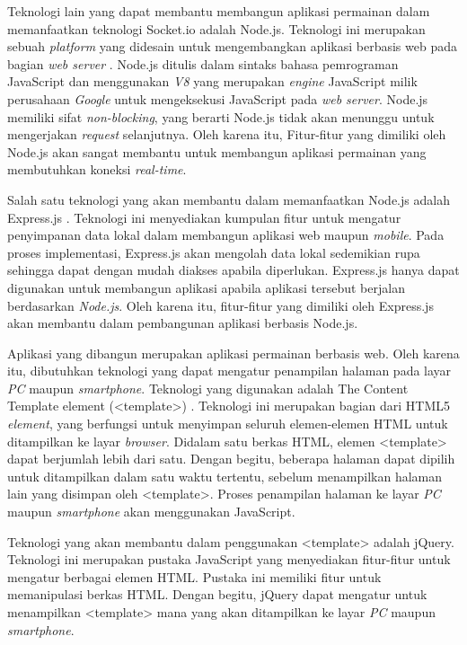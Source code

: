 Teknologi lain yang dapat membantu membangun aplikasi permainan dalam memanfaatkan teknologi Socket.io adalah Node.js. Teknologi ini merupakan sebuah \textit{platform} yang didesain untuk mengembangkan aplikasi berbasis web pada bagian \textit{web server} \cite{dahl:09:nodejsdocs}. Node.js ditulis dalam sintaks bahasa pemrograman JavaScript dan menggunakan \textit{V8} yang merupakan \textit{engine} JavaScript milik perusahaan \textit{Google} untuk mengeksekusi JavaScript pada \textit{web server}. Node.js memiliki sifat \textit{non-blocking}, yang berarti Node.js tidak akan menunggu untuk mengerjakan \textit{request} selanjutnya. Oleh karena itu, Fitur-fitur yang dimiliki oleh Node.js akan sangat membantu untuk membangun aplikasi permainan yang membutuhkan koneksi \textit{real-time}.

Salah satu teknologi yang akan membantu dalam memanfaatkan Node.js adalah Express.js \cite{tj:10:expressjs}. Teknologi ini menyediakan kumpulan fitur untuk mengatur penyimpanan data lokal dalam membangun aplikasi web maupun \textit{mobile}. Pada proses implementasi, Express.js akan mengolah data lokal sedemikian rupa sehingga dapat dengan mudah diakses apabila diperlukan. Express.js hanya dapat digunakan untuk membangun aplikasi apabila aplikasi tersebut berjalan berdasarkan \textit{Node.js}. Oleh karena itu, fitur-fitur yang dimiliki oleh Express.js akan membantu dalam pembangunan aplikasi berbasis Node.js.

Aplikasi yang dibangun merupakan aplikasi permainan berbasis web. Oleh karena itu, dibutuhkan teknologi yang dapat mengatur penampilan halaman pada layar \textit{PC} maupun \textit{smartphone}. Teknologi yang digunakan adalah The Content Template element (<template>) \cite{moz:05:template}. Teknologi ini merupakan bagian dari HTML5 \textit{element}, yang berfungsi untuk menyimpan seluruh elemen-elemen HTML untuk ditampilkan ke layar \textit{browser}. Didalam satu berkas HTML, elemen <template> dapat berjumlah lebih dari satu. Dengan begitu, beberapa halaman dapat dipilih untuk ditampilkan dalam satu waktu tertentu, sebelum menampilkan halaman lain yang disimpan oleh <template>. Proses penampilan halaman ke layar \textit{PC} maupun \textit{smartphone} akan menggunakan JavaScript.

Teknologi yang akan membantu dalam penggunakan <template> adalah jQuery. Teknologi ini merupakan pustaka JavaScript yang menyediakan fitur-fitur untuk mengatur berbagai elemen HTML. Pustaka ini memiliki fitur untuk memanipulasi berkas HTML. Dengan begitu, jQuery dapat mengatur untuk menampilkan <template> mana yang akan ditampilkan ke layar \textit{PC} maupun \textit{smartphone}.

